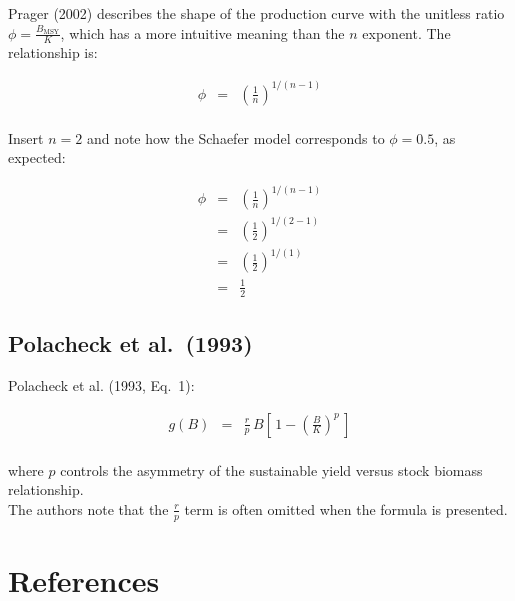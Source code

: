 \documentclass[fleqn]{article}
\newcommand{\msy}{_\mathrm{MSY}}
\begin{document}
\newpage

Prager (2002) describes the shape of the production curve with the unitless
ratio $\phi\!=\!\frac{B\msy}{K}$, which has a more intuitive meaning than the
$n$ exponent. The relationship is:

\begin{eqnarray*}
  \phi &=& \left(\frac{1}{n}\right)^{\!1/(n-1)}\\[1ex]
\end{eqnarray*}

Insert $n\!=\!2$ and note how the Schaefer model corresponds to $\phi=0.5$, as
expected:

\begin{eqnarray*}
  \phi &=& \left(\frac{1}{n}\right)^{\!1/(n-1)}\\[1em]
  ~    &=& \left(\frac{1}{2}\right)^{\!1/(2-1)}\\[1em]
  ~    &=& \left(\frac{1}{2}\right)^{\!1/(1)}\\[1em]
  ~    &=& \frac{1}{2}
\end{eqnarray*}

\subsection{Polacheck et al.\ (1993)}

Polacheck et al. (1993, Eq.~1):

\begin{eqnarray*}
  g(B) &=& \frac{r}{p}\,B\!
  \left[\,1\!-\!\left(\frac{B}{K}\right)^{\!p}\,\right]\\[1ex]
\end{eqnarray*}

where $p$ controls the asymmetry of the sustainable yield versus stock biomass
relationship.\\[1em]

The authors note that the $\frac{r}{p}$ term is often omitted when the formula
is presented.

\newpage

\section{References}
\end{document}
